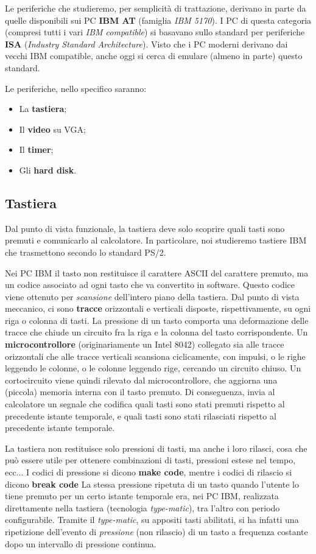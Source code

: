 \documentclass[a4paper,11pt]{article}
\begin{document}
Le periferiche che studieremo, per semplicità di trattazione, derivano in parte da quelle disponibili sui PC \textbf{IBM AT} (famiglia \textit{IBM 5170}).
I PC di questa categoria (compresi tutti i vari \textit{IBM compatible}) si basavano sullo standard per periferiche \textbf{ISA} (\textit{Industry Standard Architecture}).
Visto che i PC moderni derivano dai vecchi IBM compatible, anche oggi si cerca di emulare (almeno in parte) questo standard.

Le periferiche, nello specifico saranno:
\begin{itemize}
	\item La \textbf{tastiera};
	\item Il \textbf{video} su VGA;
	\item Il \textbf{timer};
	\item Gli \textbf{hard disk}.
\end{itemize}

\subsection{Tastiera}
Dal punto di vista funzionale, la tastiera deve solo scoprire quali tasti sono premuti e comunicarlo al calcolatore.
In particolare, noi studieremo tastiere IBM che trasmettono secondo lo standard PS/2.

Nei PC IBM il tasto non restituisce il carattere ASCII del carattere premuto, ma un codice associato ad ogni tasto che va convertito in software.
Questo codice viene ottenuto per \textit{scansione} dell'intero piano della tastiera.
Dal punto di vista meccanico, ci sono \textbf{tracce} orizzontali e verticali disposte, rispettivamente, su ogni riga o colonna di tasti.
La pressione di un tasto comporta una deformazione delle tracce che chiude un circuito fra la riga e la colonna del tasto corrispondente.
Un \textbf{microcontrollore} (originariamente un Intel 8042) collegato sia alle tracce orizzontali che alle tracce verticali scansiona ciclicamente, con impulsi, o le righe leggendo le colonne, o le colonne leggendo rige, cercando un circuito chiuso.
Un cortocircuito viene quindi rilevato dal microcontrollore, che aggiorna una (piccola) memoria interna con il tasto premuto.
Di conseguenza, invia al calcolatore un segnale che codifica quali tasti sono stati premuti rispetto al precedente istante temporale, e quali tasti sono stati rilasciati rispetto al precedente istante temporale. 

La tastiera non restituisce solo pressioni di tasti, ma anche i loro rilasci, cosa che può essere utile per ottenere combinazioni di tasti, pressioni estese nel tempo, ecc...
I codici di pressione si dicono \textbf{make code}, mentre i codici di rilascio si dicono \textbf{break code} 
La stessa pressione ripetuta di un tasto quando l'utente lo tiene premuto per un certo istante temporale era, nei PC IBM, realizzata direttamente nella tastiera (tecnologia \textit{type-matic}), tra l'altro con periodo configurabile.
Tramite il \textit{type-matic}, su appositi tasti abilitati, si ha infatti una ripetizione dell'evento di \textit{pressione} (non rilascio) di un tasto a frequenza costante dopo un intervallo di pressione continua.
\end{document}
